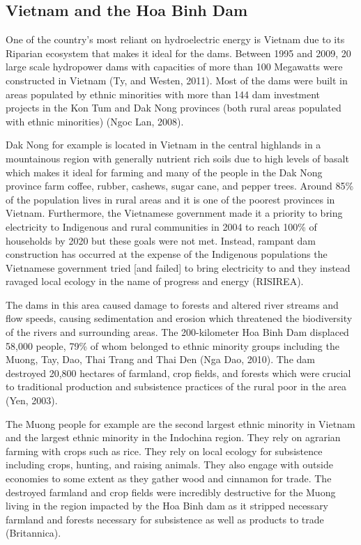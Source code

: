 \documentclass{book}\usepackage{knitr}
\begin{document}
\begin{knitrout}
\begin{kframe}
{\section{Vietnam and the Hoa Binh Dam}
  One of the country's most reliant on hydroelectric energy is Vietnam due to its Riparian ecosystem that makes it ideal for the dams. Between 1995 and 2009, 20 large scale hydropower dams with capacities of more than 100 Megawatts were constructed in Vietnam (Ty, and Westen, 2011). Most of the dams were built in areas populated by ethnic minorities with more than 144 dam investment projects in the Kon Tum and Dak Nong provinces (both rural areas populated with ethnic minorities) (Ngoc Lan, 2008). 
  
  Dak Nong for example is located in Vietnam in the central highlands in a mountainous region with generally nutrient rich soils due to high levels of basalt which makes it ideal for farming and many of the people in the Dak Nong province farm coffee, rubber, cashews, sugar cane, and pepper trees. Around 85\% of the population lives in rural areas and it is one of the poorest provinces in Vietnam. Furthermore, the Vietnamese government made it a priority to bring electricity to Indigenous and rural communities in 2004 to reach 100\% of households by 2020 but these goals were not met. Instead, rampant dam construction has occurred at the expense of the Indigenous populations the Vietnamese government tried [and failed] to bring electricity to and they instead ravaged local ecology in the name of progress and energy (RISIREA). 
  
  The dams in this area caused damage to forests and altered river streams and flow speeds, causing sedimentation and erosion which threatened the biodiversity of the rivers and surrounding areas. The 200-kilometer Hoa Binh Dam displaced 58,000 people, 79\% of whom belonged to ethnic minority groups including the Muong, Tay, Dao, Thai Trang and Thai Den (Nga Dao, 2010). The dam destroyed 20,800 hectares of farmland, crop fields, and forests which were crucial to traditional production and subsistence practices of the rural poor in the area (Yen, 2003). 
  
  The Muong people for example are the second largest ethnic minority in Vietnam and the largest ethnic minority in the Indochina region. They rely on agrarian farming with crops such as rice. They rely on local ecology for subsistence including crops, hunting, and raising animals. They also engage with outside economies to some extent as they gather wood and cinnamon for trade. The destroyed farmland and crop fields were incredibly destructive for the Muong living in the region impacted by the Hoa Binh dam as it stripped necessary farmland and forests necessary for subsistence as well as products to trade (Britannica). 
  
}
\end{kframe}
\end{knitrout}
\end{document}
